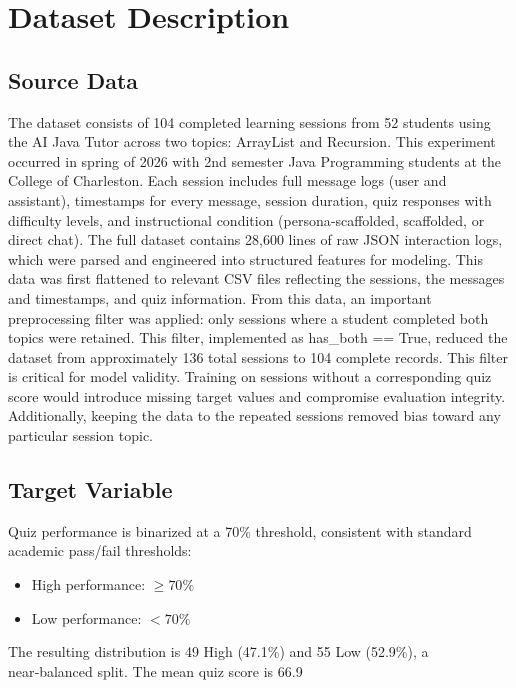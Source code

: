 \documentclass[conference]{IEEEtran}
\begin{document}
\section{Dataset Description}

\subsection{Source Data}
The dataset consists of 104 completed learning sessions from 52 students using the AI Java Tutor across two topics: ArrayList and Recursion. This experiment occurred in spring of 2026 with 2nd semester Java Programming students at the College of Charleston. Each session includes full message logs (user and assistant), timestamps for every message, session duration, quiz responses with difficulty levels, and instructional condition (persona‑scaffolded, scaffolded, or direct chat).
The full dataset contains 28,600 lines of raw JSON interaction logs, which were parsed and engineered into structured features for modeling. This data was first flattened to relevant CSV files reflecting the sessions, the messages and timestamps, and quiz information. From this data, an important preprocessing filter was applied: only sessions where a student completed both topics were retained. This filter, implemented as has\_both == True, reduced the dataset from approximately 136 total sessions to 104 complete records. This filter is critical for model validity. Training on sessions without a corresponding quiz score would introduce missing target values and compromise evaluation integrity. Additionally, keeping the data to the repeated sessions removed bias toward any particular session topic.

\subsection{Target Variable}
Quiz performance is binarized at a 70\% threshold, consistent with standard academic pass/fail thresholds:
\begin{itemize}[noitemsep]
    \item High performance: $\geq 70\%$
    \item Low performance: $< 70\%$
\end{itemize}


The resulting distribution is 49 High (47.1\%) and 55 Low (52.9\%), a near‑balanced split. The mean quiz score is 66.9%
\end{document}
